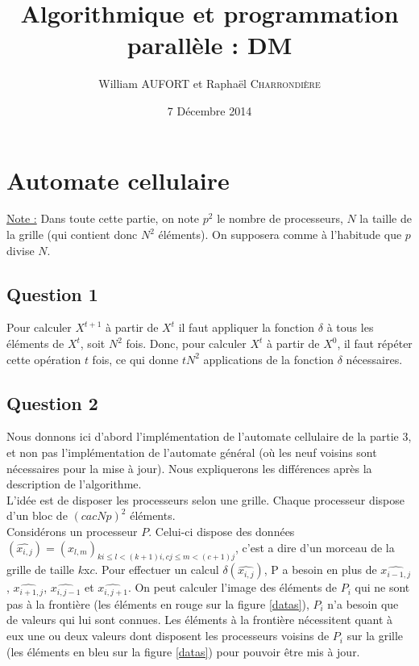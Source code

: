 \documentclass{article}
\title{Algorithmique et programmation parallèle : DM}
\author{William \textsc{AUFORT} et Raphaël \textsc{Charrondière}}
\date{7 Décembre 2014}
\begin{document}
\maketitle

\section{Automate cellulaire}

\underline{Note :} Dans toute cette partie, on note $p^2$ le nombre de processeurs, $N$ la taille de la grille (qui contient donc $N^2$ éléments).
On supposera comme à l'habitude que $p$ divise $N$.

\subsection*{Question 1}

Pour calculer $X^{t+1}$ à partir de $X^t$ il faut appliquer la fonction $\delta$ à tous les éléments de $X^t$, soit $N^2$ fois.
Donc, pour calculer $X^t$ à partir de $X^0$, il faut répéter cette opération $t$ fois, ce qui donne $t N^2$ applications de la fonction $\delta$ nécessaires.

\subsection*{Question 2}

Nous donnons ici d'abord l'implémentation de l'automate cellulaire de la partie 3, et non pas l'implémentation de l'automate général (où les neuf voisins sont nécessaires pour la mise à jour). Nous expliquerons les différences après la description de l'algorithme. \\

L'idée est de disposer les processeurs selon une grille. Chaque processeur dispose d'un bloc de $\left( cac{N}{p} \right) ^2$ éléments.\\

Considérons un processeur $P$. Celui-ci dispose des données $(\widehat{x_{i,j}})=(x_{l,m})_{ki\leq l<(k+1)i,cj\leq m<(c+1)j}$, c'est a dire d'un morceau de la grille de taille $k$x$c$.
Pour effectuer un calcul $\delta(\widehat{x_{i,j}})$, P a besoin en plus de $\widehat{x_{i-1,j}}$, $\widehat{x_{i+1,j}}$, $\widehat{x_{i,j-1}}$ et $\widehat{x_{i,j+1}}$.
On peut calculer l'image des éléments de $P_i$ qui ne sont pas à la frontière (les éléments en rouge sur la figure \ref{datas}), $P_i$ n'a besoin que de valeurs qui lui sont connues.
Les éléments à la frontière nécessitent quant à eux une ou deux valeurs dont disposent les processeurs voisins de $P_i$ sur la grille (les éléments en bleu sur la figure \ref{datas}) pour pouvoir être mis à jour.
\end{document}
